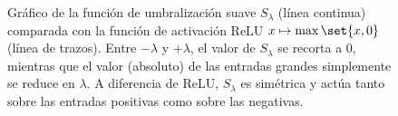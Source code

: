 \documentclass[../../book-main.tex]{subfiles}
\begin{document}
\begin{figure}
    \centering
    \caption{Gráfico de la función de umbralización suave
        \(S_{\lambda}\) (línea continua) comparada con la función de activación ReLU
        \(x \mapsto \max\set{x, 0}\) (línea de trazos).
        Entre \(-\lambda\) y \(+\lambda\), el valor
        de \(S_{\lambda}\) se recorta a \(0\), mientras que el valor
        (absoluto) de las entradas grandes simplemente se reduce en \(\lambda\).
        A diferencia de ReLU, \(S_{\lambda}\) es simétrica y actúa tanto sobre
    las entradas positivas como sobre las negativas.}
    \label{fig:soft-thresholding}
\end{figure}
\end{document}
